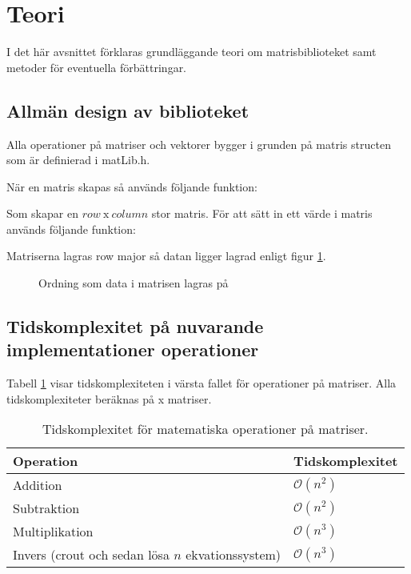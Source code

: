 \section{Teori}
I det här avsnittet förklaras grundläggande teori om matrisbiblioteket samt metoder för eventuella förbättringar.

\subsection{Allmän design av biblioteket}
Alla operationer på matriser och vektorer bygger i grunden på matris structen som är definierad i matLib.h.

När en matris skapas så används följande funktion:

Som skapar en $row \ \text{x} \ column$ stor matris.
\newline
\newline
För att sätt in ett värde i matris används följande funktion:

Matriserna lagras row major så datan ligger lagrad enligt figur \ref{fig:rowmajor}. 
\begin{figure}[h]
\center
\scalebox{0.8}{}
\caption{Ordning som data i matrisen lagras på}
\label{fig:rowmajor}
\end{figure}


\subsection{Tidskomplexitet på nuvarande implementationer operationer}
Tabell \ref{tabell:matrisopkomplexitet} visar tidskomplexiteten i värsta fallet för operationer på matriser. Alla tidskomplexiteter beräknas på \scalebox{1.2}{$n$}x\scalebox{1.2}{$n$} matriser.

\begin{table}[h]
  \centering
  \begin{tabular}{|l|l|}
    \hline
    \textbf{Operation} & \textbf{Tidskomplexitet} \\ \hline
    Addition & $\mathcal{O}(n^2)$ \\ \hline
    Subtraktion & $\mathcal{O}(n^2)$\\ \hline
    Multiplikation & $\mathcal{O}(n^3)$\\ \hline
    Invers (crout och sedan lösa $n$ ekvationssystem) & $\mathcal{O}(n^3)$\\ \hline
  \end{tabular}
  \caption{Tidskomplexitet för matematiska operationer på matriser.}
  \label{tabell:matrisopkomplexitet}
\end{table}

